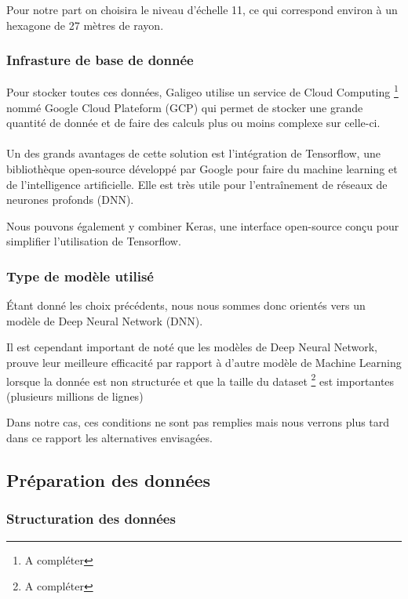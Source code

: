 Pour notre part on choisira le niveau d'échelle 11, ce qui correspond environ à un hexagone de 27 mètres de rayon.

\subsubsection{Infrasture de base de donnée}

Pour stocker toutes ces données, Galigeo utilise un service de Cloud Computing \footnote{A compléter} nommé Google Cloud Plateform (GCP) qui permet de stocker une grande quantité de donnée et de faire des calculs plus ou moins complexe sur celle-ci.

\paragraph*{}

Un des grands avantages de cette solution est l'intégration de Tensorflow, une bibliothèque open-source développé par Google pour faire du machine learning et de l'intelligence artificielle. Elle est très utile pour l'entraînement de réseaux de neurones profonds (DNN).

Nous pouvons également y combiner Keras, une interface open-source conçu pour simplifier l'utilisation de Tensorflow.


\subsubsection{Type de modèle utilisé}

\'Etant donné les choix précédents, nous nous sommes donc orientés vers un modèle de Deep Neural Network (DNN).

Il est cependant important de noté que les modèles de Deep Neural Network, prouve leur meilleure efficacité par rapport à d'autre modèle de Machine Learning lorsque la donnée est non structurée et que la taille du dataset \footnote{A compléter} est importantes (plusieurs millions de lignes)

Dans notre cas, ces conditions ne sont pas remplies mais nous verrons plus tard dans ce rapport les alternatives envisagées.


\subsection{Préparation des données}

\subsubsection{Structuration des données}

